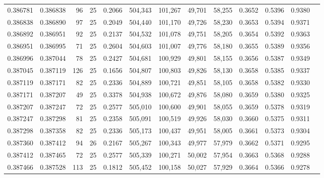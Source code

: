 \begin{tabular}{rrrrrrrrrrrrr}
0.386781 & 0.386838 &    96 &  25 &                                     0.2066 & 504,343 & 101,267 &  49,701 &  58,255 & 0.3652 & 0.5396 & 0.9380 \\
0.386838 & 0.386890 &    97 &  25 &                                     0.2049 & 504,440 & 101,170 &  49,726 &  58,230 & 0.3653 & 0.5394 & 0.9371 \\
0.386892 & 0.386951 &    92 &  25 &                                     0.2137 & 504,532 & 101,078 &  49,751 &  58,205 & 0.3654 & 0.5392 & 0.9363 \\
0.386951 & 0.386995 &    71 &  25 &                                     0.2604 & 504,603 & 101,007 &  49,776 &  58,180 & 0.3655 & 0.5389 & 0.9356 \\
0.386996 & 0.387044 &    78 &  25 &                                     0.2427 & 504,681 & 100,929 &  49,801 &  58,155 & 0.3656 & 0.5387 & 0.9349 \\
0.387045 & 0.387119 &   126 &  25 &                                     0.1656 & 504,807 & 100,803 &  49,826 &  58,130 & 0.3658 & 0.5385 & 0.9337 \\
0.387119 & 0.387171 &    82 &  25 &                                     0.2336 & 504,889 & 100,721 &  49,851 &  58,105 & 0.3658 & 0.5382 & 0.9330 \\
0.387171 & 0.387207 &    49 &  25 &                                     0.3378 & 504,938 & 100,672 &  49,876 &  58,080 & 0.3659 & 0.5380 & 0.9325 \\
0.387207 & 0.387247 &    72 &  25 &                                     0.2577 & 505,010 & 100,600 &  49,901 &  58,055 & 0.3659 & 0.5378 & 0.9319 \\
0.387247 & 0.387298 &    81 &  25 &                                     0.2358 & 505,091 & 100,519 &  49,926 &  58,030 & 0.3660 & 0.5375 & 0.9311 \\
0.387298 & 0.387358 &    82 &  25 &                                     0.2336 & 505,173 & 100,437 &  49,951 &  58,005 & 0.3661 & 0.5373 & 0.9304 \\
0.387360 & 0.387412 &    94 &  26 &                                     0.2167 & 505,267 & 100,343 &  49,977 &  57,979 & 0.3662 & 0.5371 & 0.9295 \\
0.387412 & 0.387465 &    72 &  25 &                                     0.2577 & 505,339 & 100,271 &  50,002 &  57,954 & 0.3663 & 0.5368 & 0.9288 \\
0.387466 & 0.387528 &   113 &  25 &                                     0.1812 & 505,452 & 100,158 &  50,027 &  57,929 & 0.3664 & 0.5366 & 0.9278 \\

\end{tabular}
